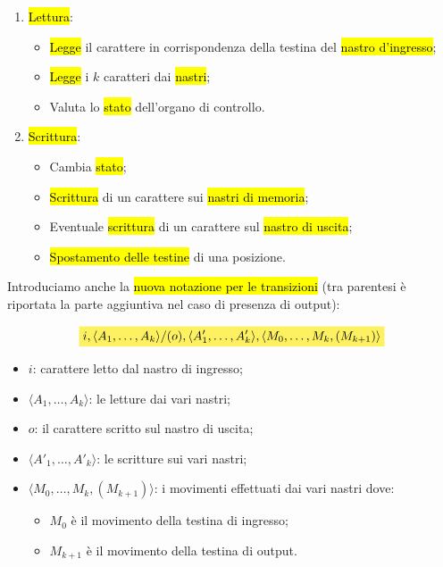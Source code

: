 \documentclass[a4paper,11pt,twoside]{article}
\theoremstyle{plain}
\theoremstyle{definition}
\theoremstyle{remark}
\newcommand{\mhl}[1]{\colorbox{hlcolor}{$\displaystyle #1$}}
\begin{document}
\begin{enumerate}
  \item \hl{Lettura}:
    \begin{itemize}
      \item \hl{Legge} il carattere in corrispondenza della testina del
        \hl{nastro d'ingresso};
      \item \hl{Legge} i $k$ caratteri dai \hl{nastri};
      \item Valuta lo \hl{stato} dell'organo di controllo.
    \end{itemize}
  \item \hl{Scrittura}:
    \begin{itemize}
      \item Cambia \hl{stato};
      \item \hl{Scrittura} di un carattere sui \hl{nastri di memoria};
      \item Eventuale \hl{scrittura} di un carattere sul \hl{nastro di uscita};
      \item \hl{Spostamento delle testine} di una posizione.
    \end{itemize}
\end{enumerate}

Introduciamo anche la \hl{nuova notazione per le transizioni} (tra parentesi è
riportata la parte aggiuntiva nel caso di presenza di output):

\begin{equation}
  \mhl{
  i, \langle A_1, \ldots, A_k \rangle/(o),
    \langle A'_1, \ldots, A'_k \rangle,
    \langle M_0, \ldots, M_k, (M_{k+1}) \rangle
  }
\end{equation}

\begin{itemize}
  \item $i$: carattere letto dal nastro di ingresso;
  \item $\langle A_1, \ldots, A_k \rangle$: le letture dai vari nastri;
  \item $o$: il carattere scritto sul nastro di uscita;
  \item $\langle A'_1, \ldots, A'_k \rangle$: le scritture sui vari nastri;
  \item $\langle M_0, \ldots, M_k, (M_{k+1}) \rangle$: i movimenti effettuati
    dai vari nastri dove:
    \begin{itemize}
      \item $M_0$ è il movimento della testina di ingresso;
      \item $M_{k+1}$ è il movimento della testina di output.
    \end{itemize}
\end{itemize}
\end{document}
